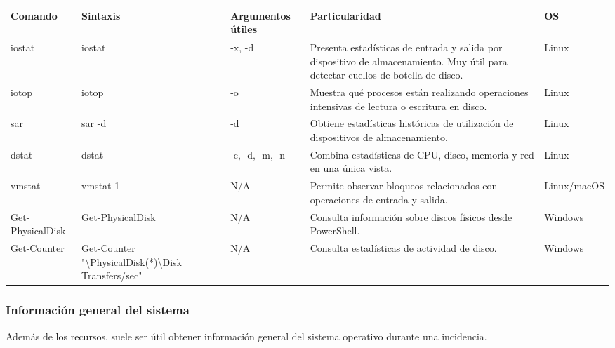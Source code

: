 \documentclass[a4paper,10pt]{article}
\begin{document}
\begin{longtable}{|p{2.8cm}|p{3.2cm}|p{4cm}|p{5.4cm}|p{1.5cm}|}

\hline
Comando &
Sintaxis &
Argumentos útiles &
Particularidad &
OS
\\
\hline
\endhead

iostat &
iostat &
-x, -d &
Presenta estadísticas de entrada y salida por dispositivo de almacenamiento. Muy útil para detectar cuellos de botella de disco. &
Linux
\\
\hline

iotop &
iotop &
-o &
Muestra qué procesos están realizando operaciones intensivas de lectura o escritura en disco. &
Linux
\\
\hline

sar &
sar -d &
-d &
Obtiene estadísticas históricas de utilización de dispositivos de almacenamiento. &
Linux
\\
\hline

dstat &
dstat &
-c, -d, -m, -n &
Combina estadísticas de CPU, disco, memoria y red en una única vista. &
Linux
\\
\hline

vmstat &
vmstat 1 &
N/A &
Permite observar bloqueos relacionados con operaciones de entrada y salida. &
Linux/macOS
\\
\hline

Get-PhysicalDisk &
Get-PhysicalDisk &
N/A &
Consulta información sobre discos físicos desde PowerShell. &
Windows
\\
\hline

Get-Counter &
Get-Counter "\textbackslash PhysicalDisk(*)\textbackslash Disk Transfers/sec" &
N/A &
Consulta estadísticas de actividad de disco. &
Windows
\\
\hline

\end{longtable}


\subsubsection{Información general del sistema}

Además de los recursos, suele ser útil obtener información general del sistema
operativo durante una incidencia.
\end{document}
